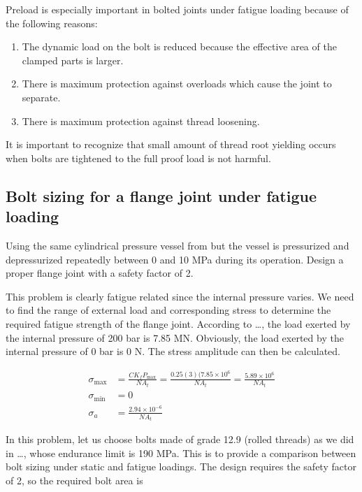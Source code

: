 \documentclass[a4paper,openany,12pt]{book}
\begin{document}
{{Preload is especially important in bolted joints under fatigue loading
because of the following reasons:

\begin{enumerate}
\item The dynamic load on the bolt is reduced because the effective area of
the clamped parts is larger.

\item There is maximum protection against overloads which cause the joint
to separate.

\item There is maximum protection against thread loosening.
\end{enumerate}

It is important to recognize that small amount of thread root yielding
occurs when bolts are tightened to the full proof load is not harmful.

\subsection{Bolt sizing for a flange joint under fatigue loading}
\label{sec:org47d99ff}

Using the same cylindrical pressure vessel from
but the vessel is pressurized and depressurized repeatedly between 0 and
10 MPa during its operation. Design a proper flange joint with a safety
factor of 2.

This problem is clearly fatigue related since the internal pressure
varies. We need to find the range of external load and corresponding
stress to determine the required fatigue strength of the flange joint.
According to \ldots{}, the load exerted by the internal pressure of 200 bar is 7.85 MN.
Obviously, the load exerted by the internal pressure of 0 bar is 0 N.
The stress amplitude can then be calculated.

$$\begin{aligned}
  \sigma_{\max } &= \frac{CK_fP_{\max}}{NA_t} = \frac{0.25(3)(7.85 \times 10^6}{NA_t} = \frac{5.89 \times 10^6}{NA_t} \\ 
  \sigma_{\min } &= 0 \\ 
  \sigma_a&= \frac{2.94 \times 10^{-6}}{NA_t} \end{aligned}$$

In this problem, let us choose bolts made of grade 12.9 (rolled threads)
as we did in \ldots{}, whose endurance limit is 190 MPa. This is to provide a comparison
between bolt sizing under static and fatigue loadings. The design
requires the safety factor of 2, so the required bolt area is

}}
\end{document}
